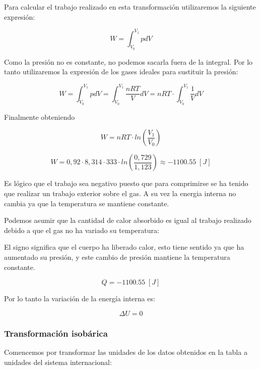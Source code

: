 \documentclass{article}
\begin{document}
Para calcular el trabajo realizado en esta transformación utilizaremos la siguiente expresión:

\begin{equation}
    W = \int_{V_0}^{V_1} p dV
\end{equation}

Como la presión no es constante, no podemos sacarla fuera de la integral. Por lo tanto utilizaremos la expresión de los gases ideales para sustituir la presión:

\begin{equation}
    W = \int_{V_0}^{V_1} p dV = \int_{V_0}^{V_1} \frac{nRT}{V} dV = nRT \cdot \int_{V_0}^{V_1} \frac{1}{V} dV
\end{equation}

Finalmente obteniendo 

\begin{equation}
    W = nRT \cdot ln(\frac{V_1}{V_0})
\end{equation}

\begin{equation}
    W = 0,92 \cdot 8,314 \cdot 333 \cdot ln(\frac{0,729}{1,123}) \approx - 1100.55 \; [J]
\end{equation}

Es lógico que el trabajo sea negativo puesto que para comprimirse se ha tenido que realizar un trabajo exterior sobre el gas.
A su vez la energia interna no cambia ya que la temperatura se mantiene constante.

Podemos asumir que la cantidad de calor absorbido es igual al trabajo realizado debido a
que el gas no ha variado su temperatura:

El signo significa que el cuerpo ha liberado calor, esto tiene sentido ya que ha aumentado
su presión, y este cambio de presión mantiene la temperatura constante.

\begin{equation}
    Q = -1100.55 \; [J]
\end{equation}

Por lo tanto la variación de la energía interna es:

\begin{equation}
    \Delta U = 0
\end{equation}

\subsubsection{Transformación isobárica}

Comencemos por transformar las unidades de los datos obtenidos en la tabla a unidades del sistema internacional:
\end{document}
